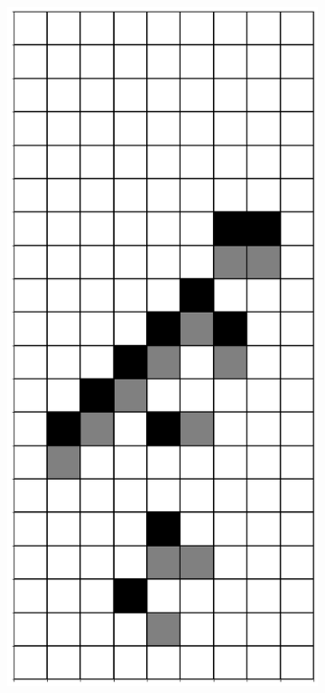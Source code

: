 \documentclass[12pt]{article}
\numberwithin{figure}{section} %
\begin{document}
\begin{figure}[H]
\begin{subfigure}{0.3\textwidth}
     \subcaption{}
   \end{subfigure}
      \newline
   \begin{subfigure}{0.3\textwidth}
     \centering
     \includegraphics[angle=270,width=\linewidth]{Section4/22.3}

\end{subfigure}
\end{figure}
\end{document}
